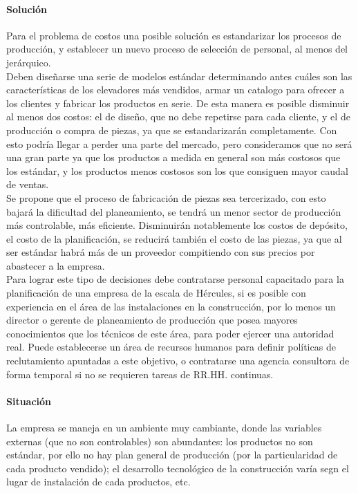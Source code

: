 \documentclass[12pt,a4paper,spanish]{article}
\begin{document}
\paragraph{Soluci\'on}
Para el problema de costos una posible soluci\'on es estandarizar los procesos de producci\'on, y establecer un nuevo proceso de selecci\'on de personal, al menos del jer\'arquico.\\
Deben dise\~narse una serie de modelos est\'andar determinando antes cu\'ales son las caracter\'isticas de los elevadores m\'as vendidos, armar un catalogo para ofrecer a los clientes y fabricar los productos en serie. De esta manera es posible disminuir al menos dos costos: el de dise\~no, que no debe repetirse para cada cliente, y el de producci\'on o compra de piezas, ya que se estandarizar\'an completamente. Con esto podr\'ia llegar a perder una parte del mercado, pero consideramos que no ser\'{a} una gran parte ya que los productos a medida en general son m\'as costosos que los est\'andar, y los productos menos costosos son los que consiguen mayor caudal de ventas.\\
Se propone que el proceso de fabricaci\'on de piezas sea tercerizado, con esto bajar\'a la dificultad del planeamiento, se tendr\'{a} un menor sector de producci\'on m\'{a}s controlable, m\'as eficiente. Disminuir\'an notablemente los costos de dep\'osito, el costo de la planificaci\'on, se reducir\'a tambi\'en el costo de las piezas, ya que al ser est\'andar habr\'a m\'as de un proveedor compitiendo con sus precios por abastecer a la empresa.\\
Para lograr este tipo de decisiones debe contratarse personal capacitado para la planificaci\'on de una empresa de la escala de H\'ercules, si es posible con experiencia en el \'area de las instalaciones en la construcci\'on, por lo menos un director o gerente de planeamiento de producci\'on que posea mayores conocimientos que los t\'ecnicos de este \'area, para poder ejercer una autoridad real. Puede establecerse un \'area de recursos humanos para definir pol\'iticas de reclutamiento apuntadas a este objetivo, o contratarse una agencia consultora de forma temporal si no se requieren tareas de RR.HH. continuas.

\paragraph{Situaci\'on}
La empresa se maneja en un ambiente muy cambiante, donde las variables externas (que no son controlables) son abundantes: los productos no son est\'andar, por ello no hay plan general de producci\'on (por la particularidad de cada producto vendido); el desarrollo tecnol\'ogico de la construcci\'on var\'ia segn el lugar de instalaci\'on de cada productos, etc.
\end{document}
